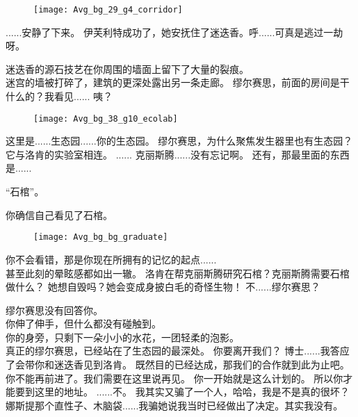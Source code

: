 \documentclass[openany]{book}
\begin{document}
\begin{figure}[h]
    \centering
    \texttt{[image: Avg\_bg\_29\_g4\_corridor]}
\end{figure}
\begin{dialogue}
     ......安静了下来。
     伊芙利特成功了，她安抚住了迷迭香。呼......可真是逃过一劫呀。\par
    迷迭香的源石技艺在你周围的墙面上留下了大量的裂痕。\\
    迷宫的墙被打碎了，建筑的更深处露出另一条走廊。
     缪尔赛思，前面的房间是干什么的？我看见......
     咦？
    \begin{figure}[h]
        \centering
        \texttt{[image: Avg\_bg\_38\_g10\_ecolab]}
    \end{figure}
     这里是......生态园......你的生态园。
     缪尔赛思，为什么聚焦发生器里也有生态园？它与洛肯的实验室相连。
     ......
     克丽斯腾......没有忘记啊。
     还有，那最里面的东西是......\par
    “石棺”。\par
    你确信自己看见了石棺。\par
    \begin{figure}[h]
        \centering
        \texttt{[image: Avg\_bg\_bg\_graduate]}
    \end{figure}\par
    你不会看错，那是你现在所拥有的记忆的起点......\\
    甚至此刻的晕眩感都如出一辙。
     洛肯在帮克丽斯腾研究石棺？克丽斯腾需要石棺做什么？
     她想自毁吗？她会变成身披白毛的奇怪生物！
     不......缪尔赛思？\par
    缪尔赛思没有回答你。\\
    你伸了伸手，但什么都没有碰触到。\\
    你的身旁，只剩下一朵小小的水花，一团轻柔的泡影。\\
    真正的缪尔赛思，已经站在了生态园的最深处。
     你要离开我们？
     博士......我答应了会带你和迷迭香见到洛肯。
     既然目的已经达成，那我们的合作就到此为止吧。
     你不能再前进了。我们需要在这里说再见。
     你一开始就是这么计划的。
     所以你才能要到这里的地址。
     ......不。
     我其实又骗了一个人，哈哈，我是不是真的很坏？
     娜斯提那个直性子、木脑袋......我骗她说我当时已经做出了决定。其实我没有。

\end{dialogue}
\end{document}
